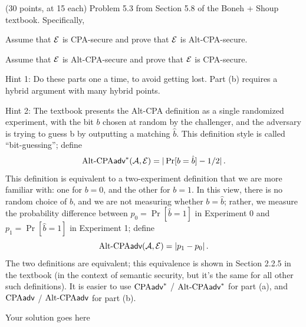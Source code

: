\documentclass[12pt]{article}
\begin{document}
\begin{problem} (30 points, at 15 each) 
Problem 5.3 from Section 5.8 of the Boneh + Shoup textbook. Specifically,

\begin{ppart}
Assume that $\mathcal{E}$ is CPA-secure and prove that $\mathcal{E}$ is Alt-CPA-secure.
\end{ppart}

\begin{ppart}
Assume that $\mathcal{E}$ is Alt-CPA-secure and prove that $\mathcal{E}$ is CPA-secure.
\end{ppart}


Hint 1: Do these parts one a time, to avoid getting lost. Part (b) requires a hybrid argument with many hybrid points.

Hint 2: The textbook presents the Alt-CPA definition as a single randomized experiment, with the bit $b$ chosen at random by the challenger, and the adversary is trying to guess b by outputting a matching $\hat b$. This definition style is called ``bit-guessing''; define 
\[
\textrm{Alt-CPA}\textsf{adv}^*(\mathcal{A}, \mathcal{E})=|\Pr[b=\hat b]-1/2|\,.
\]
This definition is equivalent to a two-experiment definition that we are more familiar with: one for $b=0$, and the other for $b=1$. In this view, there is no random choice of $b$, and we are not measuring whether $b=\hat b$; rather, we measure the probability difference between $p_0=\Pr[\hat b = 1]$ in Experiment $0$ and $p_1=\Pr[\hat b = 1]$ in Experiment 1; define 
\[
\textrm{Alt-CPA}\textsf{adv}(\mathcal{A}, \mathcal{E})=|p_1-p_0|\,.
\]
The two definitions are equivalent; this equivalence is shown in Section 2.2.5 in the textbook (in the context of semantic security, but it's the same for all other such definitions). It is easier to use $\textrm{CPA}\textsf{adv}^*$ / $\textrm{Alt-CPA}\textsf{adv}^*$ for part (a),  and $\textrm{CPA}\textsf{adv}$ / $\textrm{Alt-CPA}\textsf{adv}$ for part (b).
\end{problem}

\begin{solution}
Your solution goes here
\end{solution}
\end{document}
